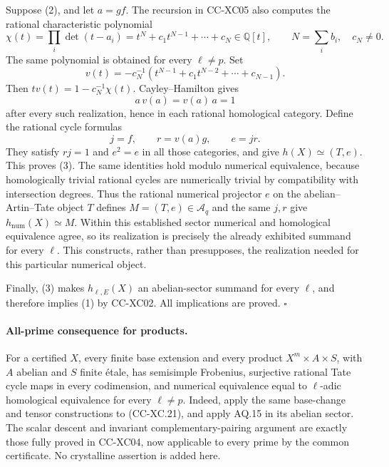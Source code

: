 Suppose (2), and let \(a=gf\).  The recursion in CC-XC05
also computes the rational characteristic polynomial
\[
 \chi(t)=\prod_i\det(t-a_i)
        =t^N+c_1t^{N-1}+\cdots+c_N\in\mathbb Q[t],
        \qquad N=\sum_i b_i,\quad c_N\ne0.
 \]
The same polynomial is obtained for every \(\ell\ne p\).
Set
\[
 v(t)=-c_N^{-1}
        (t^{N-1}+c_1t^{N-2}+\cdots+c_{N-1}).
 \]
Then \(t v(t)=1-c_N^{-1}\chi(t)\).
Cayley--Hamilton gives
\[
                       a\,v(a)=v(a)\,a=1
                                                        \tag{CC-XC.20}
\]
after every such realization, hence in each rational
homological category.  Define the rational cycle
formulas
\[
                         j=f,\qquad r=v(a)g,\qquad e=jr.
                                                        \tag{CC-XC.21}
\]
They satisfy \(rj=1\) and \(e^2=e\) in all those categories,
and give \(h(X)\simeq(T,e)\).  This proves (3).
The same identities hold modulo numerical equivalence,
because homologically trivial rational cycles are
numerically trivial by compatibility with intersection
degrees.  Thus the rational numerical projector \(e\)
on the abelian--Artin--Tate object \(T\) defines
\(M=(T,e)\in\mathcal A_q\) and the same \(j,r\)
give \(h_{\mathrm{num}}(X)\simeq M\).
Within this established sector numerical and homological
equivalence agree, so its realization is precisely the
already exhibited summand for every \(\ell\).
This constructs, rather than presupposes, the realization
needed for this particular numerical object.

Finally, (3) makes \(h_{\ell,E}(X)\) an abelian-sector
summand for every \(\ell\), and therefore implies (1)
by CC-XC02.  All implications are proved. \(\square\)

\paragraph{All-prime consequence for products.}
For a certified \(X\), every finite base extension and
every product \(X^m\times A\times S\), with \(A\) abelian
and \(S\) finite étale, has semisimple Frobenius,
surjective rational Tate cycle maps in every codimension,
and numerical equivalence equal to \(\ell\)-adic
homological equivalence for every \(\ell\ne p\).
Indeed, apply the same base-change and tensor constructions
to (CC-XC.21), and apply AQ.15 in its abelian sector.
The scalar descent and invariant complementary-pairing
argument are exactly those fully proved in CC-XC04,
now applicable to every prime by the common certificate.
No crystalline assertion is added here.


